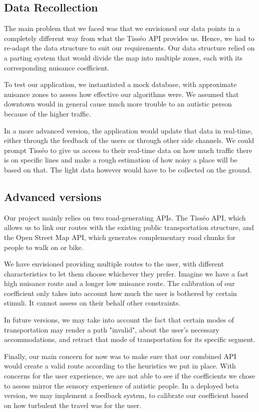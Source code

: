 \newpage


\subsection{Data Recollection}


The main problem that we faced was that we envisioned our data points in a completely different way from what the Tisséo API provides us. Hence, we had to re-adapt the data structure to suit our requirements. Our data structure relied on a parting system that would divide the map into multiple zones, each with its corresponding nuisance coefficient.


To test our application, we instantiated a mock database, with approximate nuisance zones to assess how effective our algorithms were. We assumed that downtown would in general cause much more trouble to an autistic person because of the higher traffic.


In a more advanced version, the application would update that data in real-time, either through the feedback of the users or through other side channels. We could prompt Tisséo to give us access to their real-time data on how much traffic there is on specific lines and make a rough estimation of how noisy a place will be based on that. The light data however would have to be collected on the ground.


\subsection{Advanced versions}


Our project mainly relies on two road-generating APIs. The Tisséo API, which allows us to link our routes with the existing public transportation structure, and the Open Street Map API, which generates complementary road chunks for people to walk on or bike.


We have envisioned providing multiple routes to the user, with different characteristics to let them choose whichever they prefer. Imagine we have a fast high nuisance route and a longer low nuisance route. The calibration of our coefficient only takes into account how much the user is bothered by certain stimuli. It cannot assess on their behalf other constraints.


In future versions, we may take into account the fact that certain modes of transportation may render a path "invalid", about the user's necessary accommodations, and retract that mode of transportation for its specific segment.


Finally, our main concern for now was to make sure that our combined API would create a valid route according to the heuristics we put in place. With concerns for the user experience, we are not able to see if the coefficients we chose to assess mirror the sensory experience of autistic people. In a deployed beta version, we may implement a feedback system, to calibrate our coefficient based on how turbulent the travel was for the user.
